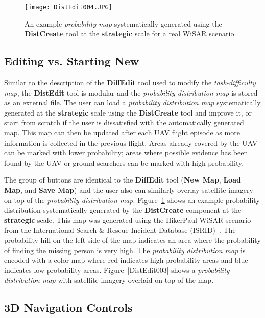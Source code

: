 \begin{figure}
\centering
\texttt{[image: DistEdit004.JPG]}
\caption{An example \textit{probability map} systematically generated using the \textbf{DistCreate} tool at the \textbf{strategic} scale for a real WiSAR scenario.}
\label{DistEdit004}
\end{figure}

\subsection{Editing vs. Starting New}

Similar to the description of the \textbf{DiffEdit} tool used to modify the \textit{task-difficulty map}, the \textbf{DistEdit} tool is modular and the \textit{probability distribution map} is stored as an external file. The user can load a \textit{probability distribution map} systematically generated at the \textbf{strategic} scale using the \textbf{DistCreate} tool and improve it, or start from scratch if the user is dissatisfied with the automatically generated map. This map can then be updated after each UAV flight episode as more information is collected in the previous flight. Areas already covered by the UAV can be marked with lower probability; areas where possible evidence has been found by the UAV or ground searchers can be marked with high probability. 

The group of buttons are identical to the \textbf{DiffEdit} tool (\textbf{New Map}, \textbf{Load Map}, and \textbf{Save Map}) and the user also can similarly overlay satellite imagery on top of the \textit{probability distribution map}. Figure~\ref{DistEdit004} shows an example probability distribution systematically generated by the \textbf{DistCreate} component at the \textbf{strategic} scale. This map was generated using the HikerPaul WiSAR scenario~\cite{Lin2014Hierarchical} from the International Search \& Rescue Incident Database (ISRID)~\cite{Koester2008Lost}. The probability hill on the left side of the map indicates an area where the probability of finding the missing person is very high. The \textit{probability distribution map} is encoded with a color map where red indicates high probability areas and blue indicates low probability areas. Figure~\ref{DistEdit003} shows a \textit{probability distribution map} with satellite imagery overlaid on top of the map.

\subsection{3D Navigation Controls}

